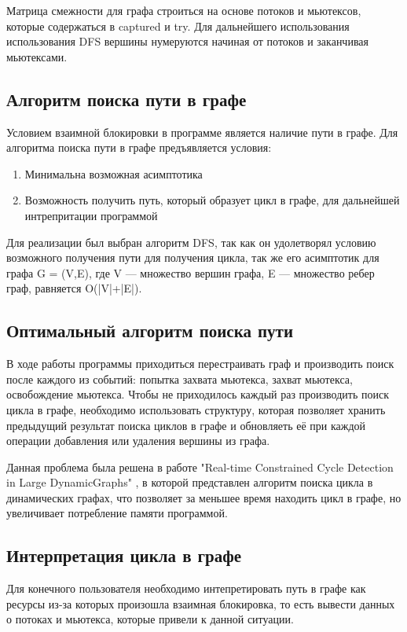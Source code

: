 \documentclass[runningheads, extrasrussian]{llncs}
\begin{document}
Матрица смежности для графа строиться на основе потоков и мьютексов, которые содержаться в captured и try. Для дальнейшего использования использования DFS вершины нумеруются начиная от потоков и заканчивая мьютексами. 

\subsection{Алгоритм поиска пути в графе}

Условием взаимной блокировки в программе является наличие пути в графе. Для алгоритма поиска пути в графе предъявляется условия:
\begin{enumerate}
    \item Минимальна возможная асимптотика
    \item Возможность получить путь, который образует цикл в графе, для дальнейшей интрепритации программой
\end{enumerate}

Для реализации был выбран алгоритм DFS\cite{ref_dsa}, так как он удолетворял условию возможного получения пути для получения цикла, так же его асимптотик для графа  G = (V,E), где V — множество вершин графа, E — множество ребер граф, равняется O(|V|+|E|).

\subsection{Оптимальный алгоритм поиска пути}

В ходе работы программы приходиться перестраивать граф и производить поиск после каждого из событий: попытка захвата мьютекса, захват мьютекса, освобождение мьютекса. Чтобы не приходилось каждый раз производить поиск цикла в графе, необходимо использовать структуру, которая позволяет хранить предыдущий результат поиска циклов в графе и обновляеть её при каждой операции добавления или удаления вершины из графа.

Данная проблема была решена в работе "Real-time Constrained Cycle Detection in Large DynamicGraphs" \cite{ref_dynamic_cycle}, в которой представлен алгоритм поиска цикла в динамических графах, что позволяет за меньшее время находить цикл в графе, но увеличивает потребление памяти программой.

\subsection{Интерпретация цикла в графе}

Для конечного пользователя необходимо интепретировать путь в графе как ресурсы из-за которых произошла взаимная блокировка, то есть вывести данных о потоках и мьютекса, которые привели к данной ситуации.
\end{document}
